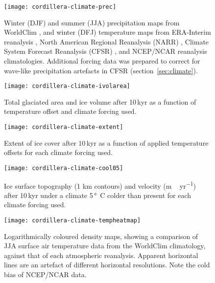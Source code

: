 \begin{figure*}[t]
	\vspace*{2mm}
	\begin{center}
		\texttt{[image: cordillera-climate-prec]}
	\end{center}
	\caption{Winter (DJF) and summer (JJA) precipitation maps from WorldClim \citep{data:worldclim}, and winter (DFJ) temperature maps from ERA-Interim reanalysis \citep{data:erai}, North American Regional Reanalysis (NARR) \citep{data:narr}, Climate System Forecast Reanalysis (CFSR) \citep{data:cfsr}, and NCEP/NCAR reanalysis \citep{data:ncar} climatologies. Additional forcing data was prepared to correct for wave-like precipitation artefacts in CFSR (section~\ref{sec:climate}).}
	\label{fig:prec}
\end{figure*}

\begin{figure}[t]
	\vspace*{2mm}
	\begin{center}
		\texttt{[image: cordillera-climate-ivolarea]}
	\end{center}
	\caption{Total glaciated area and ice volume after 10\,kyr as a function of temperature offset and climate forcing used.}
	\label{fig:ivolarea}
\end{figure}

\begin{figure*}[t]
	\vspace*{2mm}
	\begin{center}
		\texttt{[image: cordillera-climate-extent]}
	\end{center}
	\caption{Extent of ice cover after 10\,kyr as a function of applied temperature offsets for each climate forcing used.}
	\label{fig:extent}
\end{figure*}

\begin{figure*}[t]
	\vspace*{2mm}
	\begin{center}
		\texttt{[image: cordillera-climate-cool05]}
	\end{center}
	\caption{Ice surface topography (1 km contours) and velocity (\unit{m\,yr^{-1}}) after 10\,kyr under a climate 5\,\unit{\degree C} colder than present for each climate forcing used.}
	\label{fig:cool05}
\end{figure*}

\begin{figure}[t]
	\vspace*{2mm}
	\begin{center}
		\texttt{[image: cordillera-climate-tempheatmap]}
	\end{center}
	\caption{Logarithmically coloured density maps, showing a comparison of JJA surface air temperature data from the WorldClim climatology, against that of each atmospheric reanalysis. Apparent horizontal lines are an artefact of different horizontal resolutions. Note the cold bias of NCEP/NCAR data.}
	\label{fig:tempheatmap}
\end{figure}


